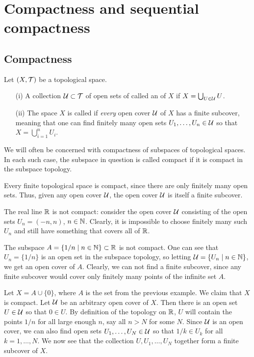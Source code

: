 \section{Compactness and sequential compactness}
\label{compactness}
\subsection{Compactness}
\begin{defn}
  Let $(X,\mathcal{T})$ be a topological space.
  \begin{enumerate}
    \item[(i)] A collection $\mathcal{U} \subset \mathcal{T}$ of open sets of called an  of $X$ if $X = \bigcup_{U \in \mathcal{U}} U$.
    \item[(ii)] The space $X$ is called  if \emph{every} open cover $\mathcal{U}$ of $X$ has a finite subcover, meaning that one can find finitely many open sets $U_1, \dots, U_n \in \mathcal{U}$ so that $X = \bigcup_{i=1}^n U_i$.
  \end{enumerate}
\end{defn}
We will often be concerned with compactness of subspaces of topological spaces. In each such case, the subspace in question is called compact if it is compact in the subspace topology.
\begin{example}
  Every finite topological space is compact, since there are only finitely many open sets. Thus, given any open cover $\mathcal{U}$, the open cover $\mathcal{U}$ is itself a finite subcover.
\end{example}
\begin{example}
  \label{reals-not-compact}
  The real line $\mathbb{R}$ is not compact: consider the open cover $\mathcal{U}$ consisting of the open sets $U_n = (-n,n)$, $n \in \mathbb{N}$. Clearly, it is impossible to choose finitely many such $U_n$ and still have something that covers all of $\mathbb{R}$.
\end{example}
\begin{example}
  The subspace $A = \{1/n \mid n \in \mathbb{N}\} \subset \mathbb{R}$ is not compact. One can see that $U_n = \{1/n\}$ is an open set in the subspace topology, so letting $\mathcal{U} = \{U_n \mid n \in \mathbb{N}\}$, we get an open cover of $A$. Clearly, we can not find a finite subcover, since any finite subcover would cover only finitely many points of the infinite set $A$.
\end{example}
\begin{example}
  Let $X = A \cup \{0\}$, where $A$ is the set from the previous example. We claim that $X$ is compact. Let $\mathcal{U}$ be an arbitrary open cover of $X$. Then there is an open set $U \in \mathcal{U}$ so that $0 \in U$. By definition of the topology on $\mathbb{R}$, $U$ will contain the points $1/n$ for all large enough $n$, say all $n > N$ for some $N$. Since $\mathcal{U}$ is an open cover, we can also find open sets $U_1, \dots, U_N \in \mathcal{U}$ so that $1/k \in U_k$ for all $k = 1, \dots, N$. We now see that the collection $U, U_1, \dots, U_N$ together form a finite subcover of $X$.
\end{example}
